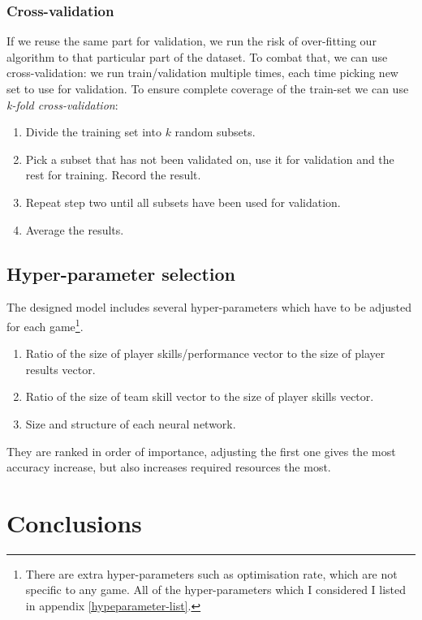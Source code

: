 \documentclass[12pt,a4paper]{book}
\begin{document}
\subsection{Cross-validation}
If we reuse the same part for validation, we run the risk of over-fitting our algorithm to that particular part of the dataset.
To combat that, we can use cross-validation: we run train/validation multiple times, each time picking new set to use for validation.
To ensure complete coverage of the train-set we can use \emph{k-fold cross-validation}: 
\begin{enumerate}
\item Divide the training set into $k$ random subsets.
\item Pick a subset that has not been validated on, use it for validation and the rest for training.
Record the result.
\item Repeat step two until all subsets have been used for validation.
\item Average the results.
\end{enumerate}
\section{Hyper-parameter selection}
The designed model includes several hyper-parameters which have to be adjusted for each game\footnote{There are extra hyper-parameters such as optimisation rate, which are not specific to any game. All of the hyper-parameters which I considered I listed in appendix  \ref{hypeparameter-list}.}.
\begin{enumerate}
\item Ratio of the size of player skills/performance vector to the size of player results vector.
\item Ratio of the size of team skill vector to the size of player skills vector.
\item Size and structure of each neural network.
\end{enumerate}
They are ranked in order of importance, adjusting the first one gives the most accuracy increase, but also increases required resources the most.


\chapter{Conclusions}


\printbibliography[heading=bibintoc,title={Bibliography}]
\end{document}
